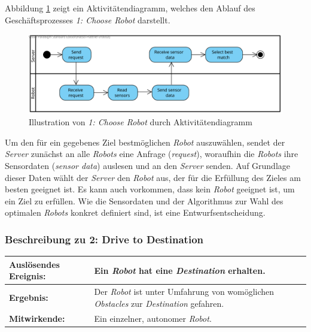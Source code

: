 			Abbildung \ref{fig:2-4-choose-robot-aktivitaetendiagramm} zeigt ein Aktivitätendiagramm, welches den Ablauf des Geschäftsprozesses \emph{1: Choose Robot} darstellt.
			\begin{figure}[H]
				\centering
				\includegraphics[width=\textwidth]{img/1-Analyse-3-Choose_Robot}
				\caption{Illustration von \emph{1: Choose Robot} durch Aktivitätendiagramm}
				\label{fig:2-4-choose-robot-aktivitaetendiagramm}
			\end{figure}

			Um den für ein gegebenes Ziel bestmöglichen \emph{Robot} auszuwählen, sendet
			der \emph{Server} zunächst an alle \emph{Robots} eine Anfrage (\emph{request}),
			woraufhin die \emph{Robots} ihre Sensordaten (\emph{sensor data}) auslesen und
			an den \emph{Server} senden. Auf Grundlage dieser Daten wählt der \emph{Server} den
			\emph{Robot} aus, der für die Erfüllung des Zieles am besten geeignet ist. 
			Es kann auch vorkommen, dass kein \emph{Robot} geeignet ist, um ein Ziel zu erfüllen. 
			Wie die Sensordaten und der Algorithmus zur Wahl des optimalen \emph{Robots} konkret definiert sind, ist eine Entwurfsentscheidung.

			\subsubsection*{Beschreibung zu 2: Drive to Destination}

			\begin{table}[H]
				\centering
				\begin{tabularx}{\textwidth}{|p{3cm}|X|}
				\hline
				\textbf{Auslösendes Ereignis:} & Ein \emph{Robot} hat eine \emph{Destination} erhalten.\\ \hline
				\textbf{Ergebnis:} & Der \emph{Robot} ist unter Umfahrung von womöglichen \emph{Obstacles} zur \emph{Destination} gefahren.\\ \hline
				\textbf{Mitwirkende:} &	Ein einzelner, autonomer \emph{Robot}. \\
				\hline
				\end{tabularx}
				\label{tab:2-4-drive-to-destination}
			\end{table}
			
